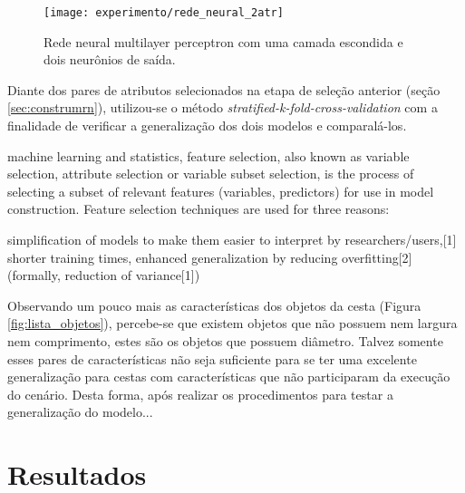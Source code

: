 \begin{figure}[!htb] \centering 
  \centering
  \texttt{[image: experimento/rede\_neural\_2atr]} 
  \caption{Rede neural multilayer perceptron com uma camada escondida e dois neurônios de saída. } 
  \label{fig:rede_neural_2atr}
\end{figure}

Diante dos pares de atributos selecionados na etapa de seleção anterior (seção \ref{sec:construmrn}), utilizou-se o método \textit{stratified-k-fold-cross-validation} com a finalidade de verificar a generalização dos dois modelos e comparalá-los.

 machine learning and statistics, feature selection, also known as variable selection, attribute selection or variable subset selection, is the process of selecting a subset of relevant features (variables, predictors) for use in model construction. Feature selection techniques are used for three reasons:

        simplification of models to make them easier to interpret by researchers/users,[1]
        shorter training times,
        enhanced generalization by reducing overfitting[2](formally, reduction of variance[1])

Observando um pouco mais as características dos objetos da cesta (Figura \ref{fig:lista_objetos}), percebe-se que existem objetos que não possuem nem largura nem comprimento, estes são os objetos que possuem diâmetro. Talvez somente esses pares de características não seja suficiente para se ter uma excelente generalização para cestas com características que não participaram da execução do cenário. Desta forma, após realizar os procedimentos para testar a generalização do modelo... 

\section{Resultados}
